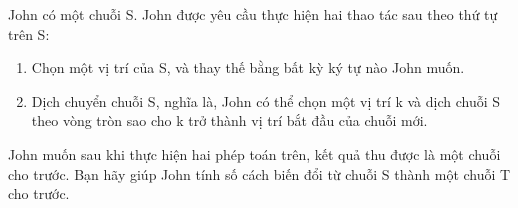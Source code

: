 John có một chuỗi S. John được yêu cầu thực hiện hai thao tác sau       theo thứ tự      trên S:  
\begin{enumerate}
	\item     Chọn một vị trí của S, và thay thế bằng bất kỳ ký tự nào John muốn.   
	\item     Dịch chuyển chuỗi S, nghĩa là, John có thể chọn một vị trí k và dịch chuỗi S theo vòng tròn sao cho k trở thành vị trí bắt đầu của chuỗi mới.   
\end{enumerate}

   John muốn sau khi thực hiện hai phép toán trên, kết quả thu được là một chuỗi cho trước.  Bạn hãy giúp John tính số cách biến đổi từ chuỗi S thành một chuỗi T cho trước.